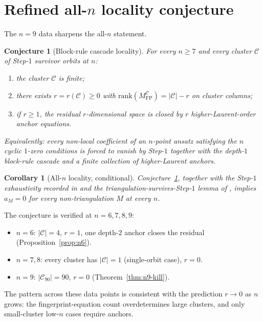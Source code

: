 \documentclass[11pt]{article}
\newtheorem{cor}[thm]{Corollary}
\newtheorem{conj}[thm]{Conjecture}
\theoremstyle{definition}
\begin{document}
\section{Refined all-$n$ locality conjecture}\label{sec:conj}

The $n=9$ data sharpens the all-$n$ statement.

\begin{conj}[Block-rule cascade locality]\label{conj:blockrule}
For every $n\ge 7$ and every cluster $\mathcal C$ of Step-$1$
survivor orbits at $n$:
\begin{enumerate}[label=\textup{(\arabic*)}]
\item the cluster $\mathcal C$ is finite;
\item there exists $r=r(\mathcal C)\ge 0$ with
$\mathrm{rank}(M_{\mathrm{FP}}^{\mathcal C})=|\mathcal C|-r$ on
cluster columns;
\item if $r\ge 1$, the residual $r$-dimensional space is closed
by $r$ higher-Laurent-order anchor equations.
\end{enumerate}
Equivalently: every non-local coefficient of an $n$-point ansatz
satisfying the $n$ cyclic $1$-zero conditions is forced to vanish
by Step-$1$ together with the depth-$1$ block-rule cascade and a
finite collection of higher-Laurent anchors.
\end{conj}

\begin{cor}[All-$n$ locality, conditional]
Conjecture~\ref{conj:blockrule}, together with the Step-$1$
exhaustivity recorded in \cite{step1stats} and the
triangulation-survives-Step-$1$ lemma of \cite{tri-survives},
implies $a_M=0$ for every non-triangulation $M$ at every $n$.
\end{cor}

The conjecture is verified at $n=6,7,8,9$:
\begin{itemize}[leftmargin=*,topsep=2pt,itemsep=2pt]
\item $n=6$: $|\mathcal C|=4$, $r=1$, one depth-$2$ anchor closes
the residual (Proposition~\ref{prop:n6}).
\item $n=7,8$: every cluster has $|\mathcal C|=1$ (single-orbit
case), $r=0$.
\item $n=9$: $|\mathcal C_{90}|=90$, $r=0$ (Theorem~\ref{thm:n9-kill}).
\end{itemize}

The pattern across these data points is consistent with the
prediction $r\to 0$ as $n$ grows: the fingerprint-equation count
overdetermines large clusters, and only small-cluster low-$n$
cases require anchors.
\end{document}
